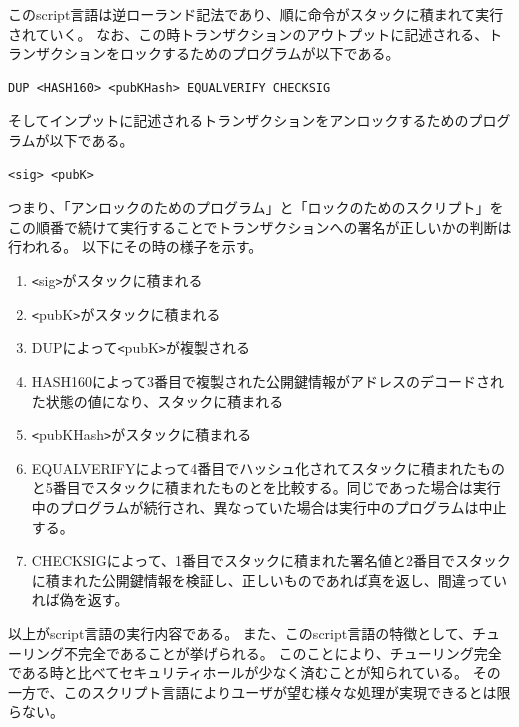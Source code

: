 このscript言語は逆ローランド記法であり、順に命令がスタックに積まれて実行されていく。
なお、この時トランザクションのアウトプットに記述される、トランザクションをロックするためのプログラムが以下である。
\begin{lstlisting}[caption=ロックを行うscript言語,label=scripting-lock]
DUP <HASH160> <pubKHash> EQUALVERIFY CHECKSIG
\end{lstlisting}
そしてインプットに記述されるトランザクションをアンロックするためのプログラムが以下である。
\begin{lstlisting}[caption=アンロックを行うscript言語,label=scripting-unlock]
<sig> <pubK>
\end{lstlisting}
つまり、「アンロックのためのプログラム」と「ロックのためのスクリプト」をこの順番で続けて実行することでトランザクションへの署名が正しいかの判断は行われる。
以下にその時の様子を示す。
\begin{enumerate}
\item \verb|<|sig\verb|>|がスタックに積まれる
\item \verb|<|pubK\verb|>|がスタックに積まれる
\item DUPによって\verb|<|pubK\verb|>|が複製される
\item HASH160によって3番目で複製された公開鍵情報がアドレスのデコードされた状態の値になり、スタックに積まれる
\item \verb|<|pubKHash\verb|>|がスタックに積まれる
\item EQUALVERIFYによって4番目でハッシュ化されてスタックに積まれたものと5番目でスタックに積まれたものとを比較する。同じであった場合は実行中のプログラムが続行され、異なっていた場合は実行中のプログラムは中止する。
\item CHECKSIGによって、1番目でスタックに積まれた署名値と2番目でスタックに積まれた公開鍵情報を検証し、正しいものであれば真を返し、間違っていれば偽を返す。
\end{enumerate}
以上がscript言語の実行内容である。
また、このscript言語の特徴として、チューリング不完全であることが挙げられる。
このことにより、チューリング完全である時と比べてセキュリティホールが少なく済むことが知られている。
その一方で、このスクリプト言語によりユーザが望む様々な処理が実現できるとは限らない。

